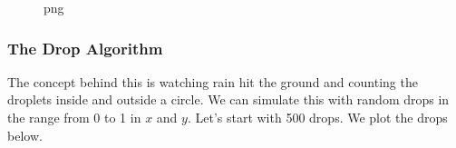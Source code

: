 \begin{Shaded}
\begin{Highlighting}[]
\OperatorTok{=} 
\OperatorTok{=}\NormalTok{,}\OperatorTok{+}
\OperatorTok{=}\OperatorTok{{-}}\OperatorTok{**}\NormalTok{)}

\OperatorTok{=}\NormalTok{(}\NormalTok{,}\NormalTok{))}


\NormalTok{plt.axis([}\NormalTok{, }\NormalTok{, }\NormalTok{, }\NormalTok{])}
\end{Highlighting}
\end{Shaded}

\begin{figure}
\centering
{}
\caption{png}
\end{figure}

\subsubsection{The Drop Algorithm}\label{the-drop-algorithm}

The concept behind this is watching rain hit the ground and counting the
droplets inside and outside a circle. We can simulate this with random
drops in the range from 0 to 1 in \(x\) and \(y\). Let's start with 500
drops. We plot the drops below.


